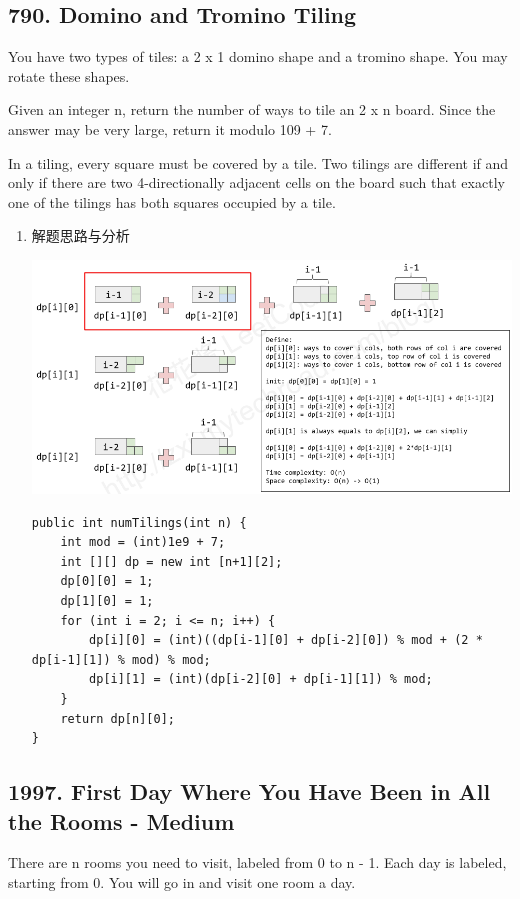 \documentclass[9pt, b5paaper]{book}
\begin{document}
\subsection{790. Domino and Tromino Tiling}
\label{sec-1-4-54}
You have two types of tiles: a 2 x 1 domino shape and a tromino shape. You may rotate these shapes.

Given an integer n, return the number of ways to tile an 2 x n board. Since the answer may be very large, return it modulo 109 + 7.

In a tiling, every square must be covered by a tile. Two tilings are different if and only if there are two 4-directionally adjacent cells on the board such that exactly one of the tilings has both squares occupied by a tile.
\begin{enumerate}
\item 解题思路与分析
\label{sec-1-4-54-1}

\includegraphics[width=.9\linewidth]{./pic/790.png}

\begin{verbatim}
public int numTilings(int n) {
    int mod = (int)1e9 + 7;
    int [][] dp = new int [n+1][2];
    dp[0][0] = 1;
    dp[1][0] = 1;
    for (int i = 2; i <= n; i++) {
        dp[i][0] = (int)((dp[i-1][0] + dp[i-2][0]) % mod + (2 * dp[i-1][1]) % mod) % mod;
        dp[i][1] = (int)(dp[i-2][0] + dp[i-1][1]) % mod;
    }
    return dp[n][0];
}
\end{verbatim}
\end{enumerate}
\subsection{1997. First Day Where You Have Been in All the Rooms - Medium}
\label{sec-1-4-55}
There are n rooms you need to visit, labeled from 0 to n - 1. Each day is labeled, starting from 0. You will go in and visit one room a day.
\end{document}
